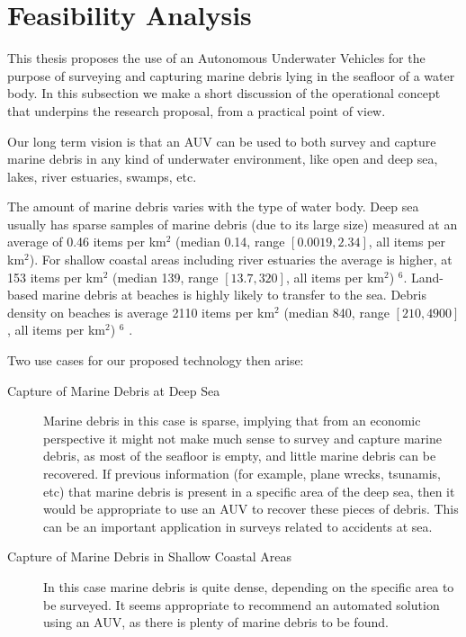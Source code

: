 \section{Feasibility Analysis}

This thesis proposes the use of an Autonomous Underwater Vehicles for the purpose of surveying and capturing marine debris lying in the seafloor of a water body. In this subsection we make a short discussion of the operational concept that underpins the research proposal, from a practical point of view.

Our long term vision is that an AUV can be used to both survey and capture marine debris in any kind of underwater environment, like open and deep sea, lakes, river estuaries, swamps, etc.

The amount of marine debris varies with the type of water body. Deep sea usually has sparse samples of marine debris (due to its large size) measured at an average of 0.46 items per km$^2$ (median 0.14, range $[0.0019, 2.34]$, all items per km$^2$)\cite{katsanevakis2008marine}. For shallow coastal areas including river estuaries the average is higher, at 153 items per km$^2$ (median 139, range $[13.7, 320]$, all items per km$^2$) \footnotesize{$^6$}.
\normalsize
Land-based marine debris at beaches is highly likely to transfer to the sea. Debris density on beaches is average 2110 items per km$^2$ (median 840, range $[210, 4900]$, all items per km$^2$) \footnotesize{$^6$} \normalsize.

Two use cases for our proposed technology then arise:

\begin{description}
    \item[Capture of Marine Debris at Deep Sea] Marine debris in this case is sparse, implying that from an economic perspective it might not make much sense to survey and capture marine debris, as most of the seafloor is empty, and little marine debris can be recovered. If previous information (for example, plane wrecks, tsunamis, etc) that marine debris is present in a specific area of the deep sea, then it would be appropriate to use an AUV to recover these pieces of debris. This can be an important application in surveys related to accidents at sea.
    
    \item[Capture of Marine Debris in Shallow Coastal Areas] In this case marine debris is quite dense, depending on the specific area to be surveyed. It seems appropriate to recommend an automated solution using an AUV, as there is plenty of marine debris to be found.
\end{description}

